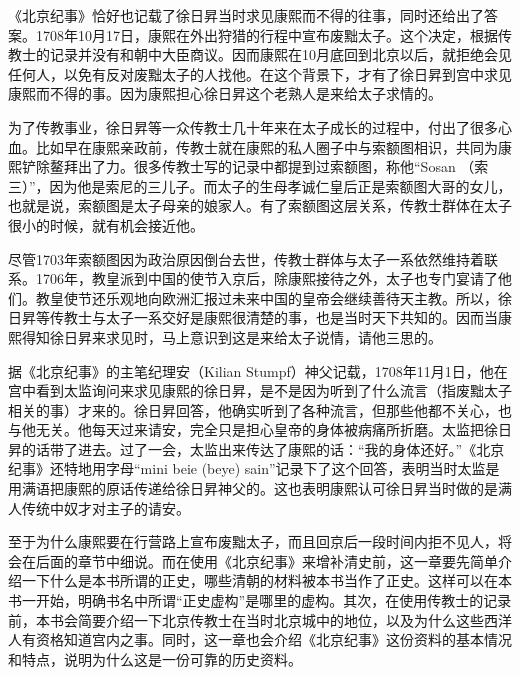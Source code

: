 
《北京纪事》恰好也记载了徐日昇当时求见康熙而不得的往事，同时还给出了答案。1708年10月17日，康熙在外出狩猎的行程中宣布废黜太子。这个决定，根据传教士的记录并没有和朝中大臣商议。因而康熙在10月底回到北京以后，就拒绝会见任何人，以免有反对废黜太子的人找他。在这个背景下，才有了徐日昇到宫中求见康熙而不得的事。因为康熙担心徐日昇这个老熟人是来给太子求情的。



为了传教事业，徐日昇等一众传教士几十年来在太子成长的过程中，付出了很多心血。比如早在康熙亲政前，传教士就在康熙的私人圈子中与索额图相识，共同为康熙铲除鳌拜出了力。很多传教士写的记录中都提到过索额图，称他“Sosan （索三）”，因为他是索尼的三儿子。而太子的生母孝诚仁皇后正是索额图大哥的女儿，也就是说，索额图是太子母亲的娘家人。有了索额图这层关系，传教士群体在太子很小的时候，就有机会接近他。



尽管1703年索额图因为政治原因倒台去世，传教士群体与太子一系依然维持着联系。1706年，教皇派到中国的使节入京后，除康熙接待之外，太子也专门宴请了他们。教皇使节还乐观地向欧洲汇报过未来中国的皇帝会继续善待天主教。所以，徐日昇等传教士与太子一系交好是康熙很清楚的事，也是当时天下共知的。因而当康熙得知徐日昇来求见时，马上意识到这是来给太子说情，请他三思的。



据《北京纪事》的主笔纪理安（Kilian Stumpf）神父记载，1708年11月1日，他在宫中看到太监询问来求见康熙的徐日昇，是不是因为听到了什么流言（指废黜太子相关的事）才来的。徐日昇回答，他确实听到了各种流言，但那些他都不关心，也与他无关。他每天过来请安，完全只是担心皇帝的身体被病痛所折磨。太监把徐日昇的话带了进去。过了一会，太监出来传达了康熙的话：“我的身体还好。”《北京纪事》还特地用字母“mini beie (beye) sain”记录下了这个回答，表明当时太监是用满语把康熙的原话传递给徐日昇神父的。这也表明康熙认可徐日昇当时做的是满人传统中奴才对主子的请安。



至于为什么康熙要在行营路上宣布废黜太子，而且回京后一段时间内拒不见人，将会在后面的章节中细说。而在使用《北京纪事》来增补清史前，这一章要先简单介绍一下什么是本书所谓的正史，哪些清朝的材料被本书当作了正史。这样可以在本书一开始，明确书名中所谓“正史虚构”是哪里的虚构。其次，在使用传教士的记录前，本书会简要介绍一下北京传教士在当时北京城中的地位，以及为什么这些西洋人有资格知道宫内之事。同时，这一章也会介绍《北京纪事》这份资料的基本情况和特点，说明为什么这是一份可靠的历史资料。


\begin{sectionnotes}




\end{sectionnotes}
